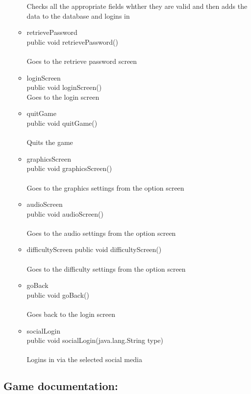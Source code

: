 \documentclass[letterpaper]{article}
\begin{document}
\begin{itemize}
\begin{itemize}
												Checks all the appropriate fields whther they are valid and then adds the data to the database and logins in
										\item	retrievePassword \\
												public void retrievePassword() \\ \\
												Goes to the retrieve password screen
										\item	loginScreen \\
												public void loginScreen() \\
												Goes to the login screen
										\item	quitGame \\
												public void quitGame() \\ \\
												Quits the game
										\item	graphicsScreen \\
												public void graphicsScreen() \\ \\
												Goes to the graphics settings from the option screen
										\item	audioScreen \\
												public void audioScreen() \\ \\
												Goes to the audio settings from the option screen
										\item	difficultyScreen
												public void difficultyScreen() \\ \\
												Goes to the difficulty settings from the option screen
										\item	goBack \\
												public void goBack() \\ \\
												Goes back to the login screen
										\item	socialLogin \\
												public void socialLogin(java.lang.String type) \\ \\
												Logins in via the selected social media
									\end{itemize}
						\end{itemize}
						
					\vspace{0.2in}
					\subsection*{Game documentation:}
					\vspace{0.1in}
					
\end{document}
